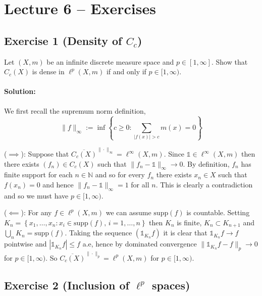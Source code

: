 \section{Lecture 6 -- Exercises}

\subsection{Exercise 1 (Density of \texorpdfstring{$C_{c}$}{})}
Let $(X,m)$ be an infinite discrete measure space and $p\in[1,\infty]$. Show that $C_{c}(X)$ is dense in $\ell^{p}(X,m)$ if and only if $p\in[1,\infty)$.

\paragraph{Solution:}
We first recall the supremum norm definition,
\begin{equation*}
	\|f\|_{\infty}:=\inf\left\{c\geq 0 \colon \sum_{|f(x)|>c}m(x)=0\right\}
\end{equation*}

($\implies$): Suppose that $\overline{C_{c}(X)}^{\|\cdot\|_{\infty}}=\ell^{\infty}(X,m)$. Since $\mathds{1}\in\ell^{\infty}(X,m)$ then there exists $(f_{n})\in C_{c}(X)$ such that $\|f_{n}-\mathds{1}\|_{\infty}\to 0$. By definition, $f_{n}$ has finite support for each $n\in\mathbb{N}$ and so for every $f_{n}$ there exists $x_{n}\in X$ such that $f(x_{n})=0$ and hence $\|f_{n}-\mathds{1}\|_{\infty}=1$ for all $n$. This is clearly a contradiction and so we must have $p\in[1,\infty)$.

($\impliedby$): For any $f\in\ell^{p}(X,m)$ we can assume $\text{supp}(f)$ is countable. Setting $K_{n}=\left\{x_{1},\ldots,x_{n}\colon x_{i}\in \text{supp}(f),\, i=1,\ldots,n\right\}$ then $K_{n}$ is finite, $K_{n}\subset K_{n+1}$ and $\bigcup_{n}K_{n}=\text{supp}(f)$. Taking the sequence $(\mathds{1}_{K_{n}}f)$ it is clear that $\mathds{1}_{K_{n}}f\to f$ pointwise and $|\mathds{1}_{K_{n}}f|\leq f$ a.e, hence by dominated convergence $\|\mathds{1}_{K_{n}}f - f\|_{p}\to 0$ for $p\in[1,\infty)$. So $\overline{C_{c}(X)}^{\|\cdot\|_{p}}=\ell^{p}(X,m)$ for $p\in[1,\infty)$.

\subsection{Exercise 2 (Inclusion of \texorpdfstring{$\ell^{p}$}{} spaces)}

